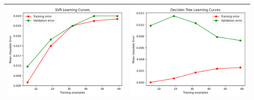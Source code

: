 \begin{table}[H]
    \centering
    \footnotesize
    \setlength\tabcolsep{0pt}
    \begin{tabularx}{\textwidth}{|X|X|}
        \hline
        \includegraphics[width=\linewidth, trim=0 0 0 0]{images/SVR_lc80_ridottoAzure.png} &
        \includegraphics[width=\linewidth, trim=0 0 0 0]{images/DecisionTree_lc80_ridottoAzure.png} \\
        \hline

\end{tabularx}
\end{table}

